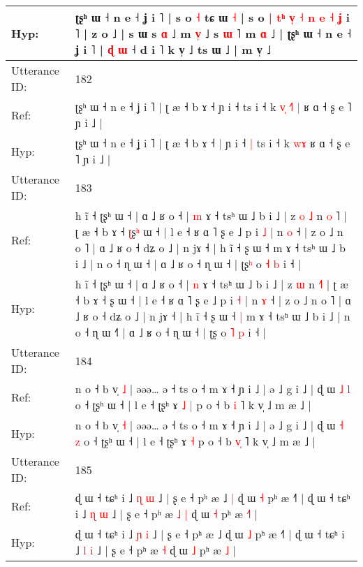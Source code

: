 \documentclass[10pt]{article}
\DeclareRobustCommand{\hl}[1]{{\textcolor{red}{#1}}}
\begin{document}
\begin{longtable}{ll}
 \\
Hyp: & ʈʂʰ ɯ ˧ n e ˧ ʝ i ˥ | s o \hl{˧} tɕ ɯ \hl{}\hl{˧} | s o \hl{|} \hl{t}\hl{ʰ} \hl{v}\hl{̩} \hl{˧} \hl{}\hl{}\hl{n} \hl{e} \hl{˧} \hl{ʝ} i \hl{}˥ | z o ˩ | s\hl{}\hl{}\hl{}\hl{}\hl{}\hl{} ɯ s \hl{ɑ} ˩ m \hl{v}\hl{̩} ˩ s \hl{ɯ} ˥ m \hl{ɑ} ˩ | ʈʂʰ ɯ ˧ n e ˧ ʝ i ˥ | \hl{ɖ} \hl{ɯ} ˧ d i ˥ k v̩ ˩ ts ɯ ˩ | m v̩ ˩
 \\
\midrule
Utterance ID: & 182 \\
Ref: & ʈʂʰ ɯ ˧ n e ˧ ʝ i ˥ | ʈ æ ˧ b ɤ ˧\hl{}\hl{} ɲ i ˧\hl{}\hl{} ts i ˧ k\hl{ }\hl{v}\hl{̩} \hl{˧}\hl{˥}\hl{ }\hl{|} ʁ ɑ ˧ ʂ e ˥ ɲ i ˩ |
 \\
Hyp: & ʈʂʰ ɯ ˧ n e ˧ ʝ i ˥ | ʈ æ ˧ b ɤ ˧\hl{ }\hl{|} ɲ i ˧\hl{ }\hl{|} ts i ˧ k\hl{}\hl{}\hl{} \hl{}\hl{}\hl{w}\hl{ɤ} ʁ ɑ ˧ ʂ e ˥ ɲ i ˩ |
 \\
\midrule
Utterance ID: & 183 \\
Ref: & h ĩ ˧ ʈʂʰ ɯ ˧ | ɑ ˩ ʁ o ˧ | \hl{m} ɤ ˧ tsʰ ɯ ˩ b i ˩ | z\hl{ }\hl{o} \hl{˩} n \hl{o}\hl{ }˥ | ʈ æ ˧ b ɤ ˧ \hl{ʈ}ʂ\hl{ʰ} ɯ ˧ | l e ˧ ʁ ɑ ˥ ʂ e ˩ p i \hl{˩} | n \hl{o} ˧ | z o ˩ n o ˥ | ɑ ˩ ʁ o ˧ dʑ o ˩ | n jɤ ˧ | h ĩ ˧ ʂ ɯ ˧\hl{}\hl{} m ɤ ˧ tsʰ ɯ ˩ b i ˩ | n o ˧ ɳ ɯ ˧\hl{} | ɑ ˩ ʁ o ˧ ɳ ɯ ˧ | ʈʂ\hl{ʰ} o \hl{˧} \hl{b} i ˧ |
 \\
Hyp: & h ĩ ˧ ʈʂʰ ɯ ˧ | ɑ ˩ ʁ o ˧ | \hl{n} ɤ ˧ tsʰ ɯ ˩ b i ˩ | z\hl{}\hl{} \hl{ɯ} n \hl{}\hl{˧}˥ | ʈ æ ˧ b ɤ ˧ \hl{}ʂ\hl{} ɯ ˧ | l e ˧ ʁ ɑ ˥ ʂ e ˩ p i \hl{˧} | n \hl{ɤ} ˧ | z o ˩ n o ˥ | ɑ ˩ ʁ o ˧ dʑ o ˩ | n jɤ ˧ | h ĩ ˧ ʂ ɯ ˧\hl{ }\hl{|} m ɤ ˧ tsʰ ɯ ˩ b i ˩ | n o ˧ ɳ ɯ ˧\hl{˥} | ɑ ˩ ʁ o ˧ ɳ ɯ ˧ | ʈʂ\hl{} o \hl{˥} \hl{p} i ˧ |
 \\
\midrule
Utterance ID: & 184 \\
Ref: & n o ˧ b v̩ \hl{˩} | əəə… ə ˧ ts o ˧ m ɤ ˧ ɲ i ˩ | ə ˩ g i ˩ | ɖ ɯ \hl{˩} \hl{l} o ˧ ʈʂʰ ɯ ˧ | l e ˧ ʈʂʰ ɤ\hl{ }\hl{˩} \hl{|} p o ˧ b \hl{}\hl{i} ˥ k v̩ ˩ m æ ˩ |
 \\
Hyp: & n o ˧ b v̩ \hl{˧} | əəə… ə ˧ ts o ˧ m ɤ ˧ ɲ i ˩ | ə ˩ g i ˩ | ɖ ɯ \hl{˧} \hl{z} o ˧ ʈʂʰ ɯ ˧ | l e ˧ ʈʂʰ ɤ\hl{}\hl{} \hl{˧} p o ˧ b \hl{v}\hl{̩} ˥ k v̩ ˩ m æ ˩ |
 \\
\midrule
Utterance ID: & 185 \\
Ref: & ɖ ɯ ˧ tɕʰ i ˩ \hl{ɳ} \hl{ɯ} ˩ | ʂ e ˧ pʰ æ ˩\hl{ }\hl{|} ɖ ɯ \hl{˧} pʰ æ ˧˥ | ɖ ɯ ˧ tɕʰ i ˩ \hl{ɳ} \hl{ɯ} ˩ | ʂ e ˧ pʰ æ\hl{ }\hl{˩} \hl{|} ɖ ɯ \hl{˧} pʰ æ \hl{˧}\hl{˥} |
 \\
Hyp: & ɖ ɯ ˧ tɕʰ i ˩ \hl{ɲ} \hl{i} ˩ | ʂ e ˧ pʰ æ ˩\hl{}\hl{} ɖ ɯ \hl{˩} pʰ æ ˧˥ | ɖ ɯ ˧ tɕʰ i ˩ \hl{l} \hl{i} ˩ | ʂ e ˧ pʰ æ\hl{}\hl{} \hl{˧} ɖ ɯ \hl{˩} pʰ æ \hl{}\hl{˩} |

\end{longtable}
\end{document}
